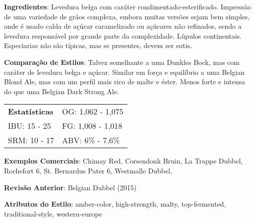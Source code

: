 \textbf{Ingredientes}: Levedura belga com caráter condimentado-esterificado. Impressão de uma variedade de grãos complexa, embora muitas versões sejam bem simples, onde é usado calda de açúcar caramelizado ou açúcares não refinados, sendo a levedura responsável por grande parte da complexidade. Lúpulos continentais. Especiarias não são típicas, mas se presentes, devem ser sutis.

\textbf{Comparação de Estilos}: Talvez semelhante a uma Dunkles Bock, mas com caráter de levedura belga e açúcar. Similar em força e equilíbrio a uma Belgian Blond Ale, mas com um perfil mais rico de malte e éster. Menos forte e intensa do que uma Belgian Dark Strong Ale.

\begin{tabular}{@{}p{35mm}p{35mm}@{}}
  \textbf{Estatísticas} & OG: 1,062 - 1,075 \\
  IBU: 15 - 25  & FG: 1,008 - 1,018  \\
  SRM: 10 - 17  & ABV: 6\% - 7,6\%
\end{tabular}

\textbf{Exemplos Comerciais}: Chimay Red, Corsendonk Bruin, La Trappe Dubbel, Rochefort 6, St. Bernardus Pater 6, Westmalle Dubbel.

\textbf{Revisão Anterior}: Belgian Dubbel (2015)

\textbf{Atributos do Estilo}: amber-color, high-strength, malty, top-fermented, traditional-style, western-europe
